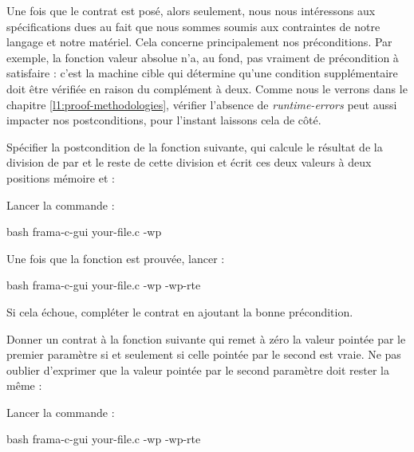 Une fois que le contrat est posé, alors seulement, nous nous intéressons aux
spécifications dues au fait que nous sommes soumis aux contraintes de notre langage
et notre matériel. Cela concerne principalement nos préconditions. Par exemple,
la fonction valeur absolue n'a, au fond, pas  vraiment de précondition à
satisfaire : c'est la machine cible qui détermine qu'une condition supplémentaire
doit être vérifiée en raison du complément à deux. Comme nous le verrons dans le
chapitre \ref{l1:proof-methodologies}, vérifier l'absence de \emph{runtime-errors}
peut aussi impacter nos postconditions, pour l'instant laissons cela de côté.






Spécifier la postcondition de la fonction suivante, qui calcule le résultat
de la division de  par  et le reste de cette
division et écrit ces deux valeurs à deux positions mémoire 
et  :




Lancer la commande :


\begin{CodeBlock}{bash}
frama-c-gui your-file.c -wp
\end{CodeBlock}


Une fois que la fonction est prouvée, lancer :

\begin{CodeBlock}{bash}
frama-c-gui your-file.c -wp -wp-rte
\end{CodeBlock}


Si cela échoue, compléter le contrat en ajoutant la bonne précondition.




Donner un contrat à la fonction suivante qui remet à zéro la valeur
pointée par le premier paramètre si et seulement si celle pointée par le
second est vraie. Ne pas oublier d'exprimer que la valeur pointée par le second
paramètre doit rester la même :




Lancer la commande :


\begin{CodeBlock}{bash}
frama-c-gui your-file.c -wp -wp-rte
\end{CodeBlock}




